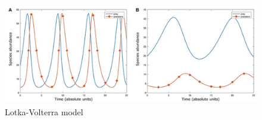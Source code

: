   \begin{figure}[H]
    \centering
    \includegraphics[width=\textwidth]{volterra.png}
    \caption{Lotka-Volterra model}
    \label{fig:Volterra}
  \end{figure}
